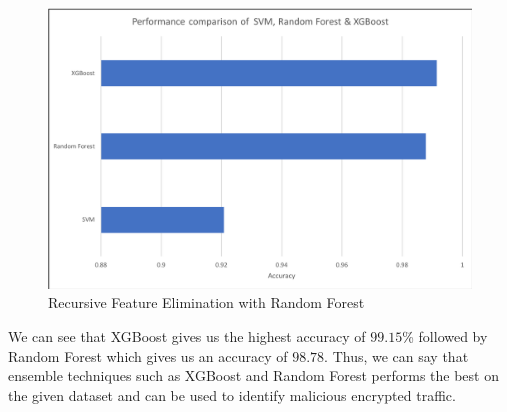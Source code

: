 \begin{figure}[htb]
	\centering
	\includegraphics[width=1\textwidth]{images/svm_rf_xgb.png}
	\caption{Recursive Feature Elimination with Random Forest} 
	\label{fig:result_svm_rf_xgb}
\end{figure}

We can see that XGBoost gives us the highest accuracy of $99.15$\% followed by Random Forest which gives us an accuracy of $98.78$. Thus, we can say that ensemble techniques such as XGBoost and Random Forest performs the best on the given dataset and can be used to identify malicious encrypted traffic.